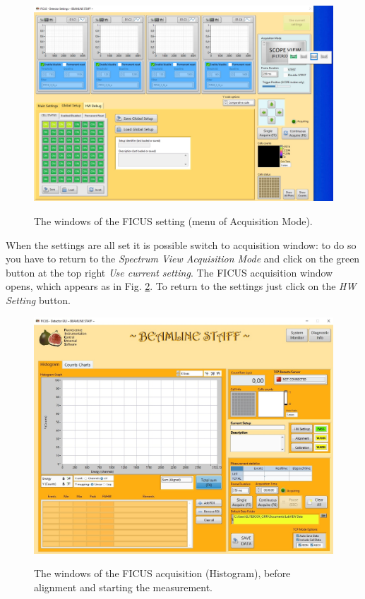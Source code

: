 \documentclass[a4paper,12pt,oneside,pdflatex,italian,final,twocolumn]{article}
\begin{document}
\begin{figure}[h]
\centering
{\includegraphics[width=.95\textwidth]{Cattura106b.jpg}} \quad
\caption{The windows of the FICUS setting (menu of Acquisition Mode).}\label{fig:fig43}
\end{figure}

When the settings are all set it is possible switch to acquisition window: to do so you have to return to the \textit{Spectrum View Acquisition Mode} and click on the green button at the top right \textit{Use current setting}.
The FICUS acquisition window opens, which appears as in Fig. \ref{fig:fig44}. To return to the settings just click on the \textit{HW Setting} button.

\begin{figure}[h]
\centering
{\includegraphics[width=.9\textwidth]{Cattura81.jpg}} \quad
\caption{The windows of the FICUS acquisition (Histogram), before alignment and starting the measurement.}\label{fig:fig44}
\end{figure}
\end{document}
